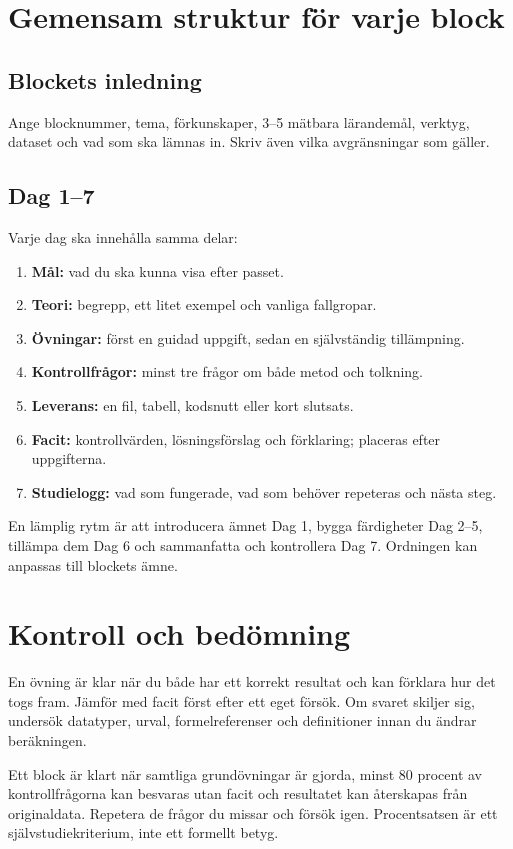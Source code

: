 \documentclass[11pt,a4paper]{article}
\begin{document}
\section{Gemensam struktur för varje block}
\subsection{Blockets inledning}
Ange blocknummer, tema, förkunskaper, 3--5 mätbara lärandemål, verktyg, dataset och vad som ska lämnas in. Skriv även vilka avgränsningar som gäller.
\subsection{Dag 1--7}
Varje dag ska innehålla samma delar:
\begin{enumerate}
\item \textbf{Mål:} vad du ska kunna visa efter passet.
\item \textbf{Teori:} begrepp, ett litet exempel och vanliga fallgropar.
\item \textbf{Övningar:} först en guidad uppgift, sedan en självständig tillämpning.
\item \textbf{Kontrollfrågor:} minst tre frågor om både metod och tolkning.
\item \textbf{Leverans:} en fil, tabell, kodsnutt eller kort slutsats.
\item \textbf{Facit:} kontrollvärden, lösningsförslag och förklaring; placeras efter uppgifterna.
\item \textbf{Studielogg:} vad som fungerade, vad som behöver repeteras och nästa steg.
\end{enumerate}
En lämplig rytm är att introducera ämnet Dag 1, bygga färdigheter Dag 2--5, tillämpa dem Dag 6 och sammanfatta och kontrollera Dag 7. Ordningen kan anpassas till blockets ämne.

\section{Kontroll och bedömning}
En övning är klar när du både har ett korrekt resultat och kan förklara hur det togs fram. Jämför med facit först efter ett eget försök. Om svaret skiljer sig, undersök datatyper, urval, formelreferenser och definitioner innan du ändrar beräkningen.

Ett block är klart när samtliga grundövningar är gjorda, minst 80 procent av kontrollfrågorna kan besvaras utan facit och resultatet kan återskapas från originaldata. Repetera de frågor du missar och försök igen. Procentsatsen är ett självstudiekriterium, inte ett formellt betyg.
\end{document}

